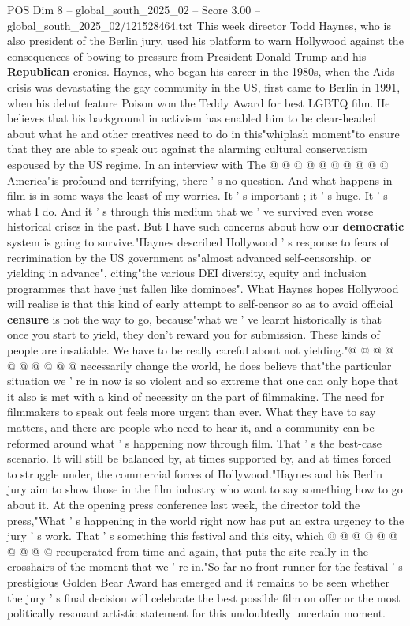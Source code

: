 \begin{textsample}{POS Dim 8 – global\_south\_2025\_02 – Score 3.00 – global\_south\_2025\_02/121528464.txt}
This week director Todd Haynes, who is also president of the Berlin jury, used his platform to warn Hollywood against the consequences of bowing to pressure from President Donald Trump and his \textbf{Republican} cronies.
Haynes, who began his career in the 1980s, when the Aids crisis was devastating the gay community in the US, first came to Berlin in 1991, when his debut feature Poison won the Teddy Award for best LGBTQ film.
He believes that his background in activism has enabled him to be clear-headed about what he and other creatives need to do in this"whiplash moment"to ensure that they are able to speak out against the alarming cultural conservatism espoused by the US regime.
In an interview with The @ @ @ @ @ @ @ @ @ @ America"is profound and terrifying, there ' s no question.
And what happens in film is in some ways the least of my worries.
It ' s important ; it ' s huge.
It ' s what I do.
And it ' s through this medium that we ' ve survived even worse historical crises in the past.
But I have such concerns about how our \textbf{democratic} system is going to survive."Haynes described Hollywood ' s response to fears of recrimination by the US government as"almost advanced self-censorship, or yielding in advance", citing"the various DEI diversity, equity and inclusion programmes that have just fallen like dominoes".
What Haynes hopes Hollywood will realise is that this kind of early attempt to self-censor so as to avoid official \textbf{censure} is not the way to go, because"what we ' ve learnt historically is that once you start to yield, they don't reward you for submission.
These kinds of people are insatiable.
We have to be really careful about not yielding."@ @ @ @ @ @ @ @ @ @ necessarily change the world, he does believe that"the particular situation we ' re in now is so violent and so extreme that one can only hope that it also is met with a kind of necessity on the part of filmmaking.
The need for filmmakers to speak out feels more urgent than ever.
What they have to say matters, and there are people who need to hear it, and a community can be reformed around what ' s happening now through film.
That ' s the best-case scenario.
It will still be balanced by, at times supported by, and at times forced to struggle under, the commercial forces of Hollywood."Haynes and his Berlin jury aim to show those in the film industry who want to say something how to go about it.
At the opening press conference last week, the director told the press,"What ' s happening in the world right now has put an extra urgency to the jury ' s work.
That ' s something this festival and this city, which @ @ @ @ @ @ @ @ @ @ recuperated from time and again, that puts the site really in the crosshairs of the moment that we ' re in."So far no front-runner for the festival ' s prestigious Golden Bear Award has emerged and it remains to be seen whether the jury ' s final decision will celebrate the best possible film on offer or the most politically resonant artistic statement for this undoubtedly uncertain moment.

\end{textsample}
